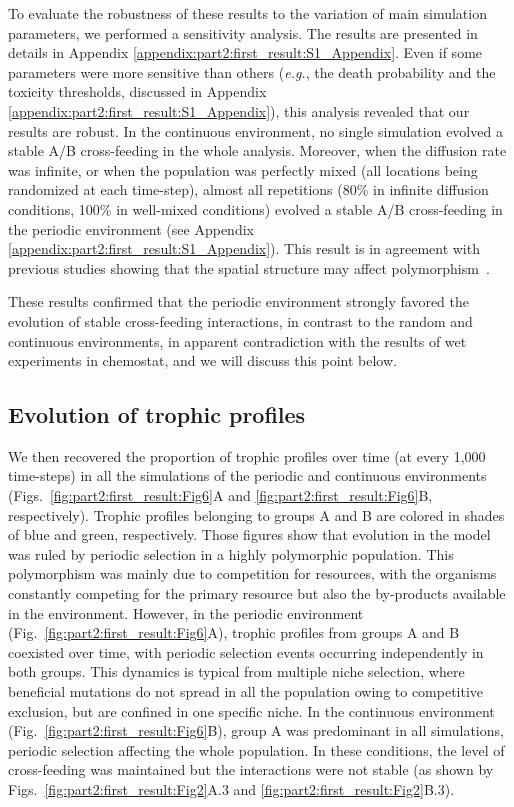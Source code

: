 To evaluate the robustness of these results to the variation of main simulation parameters, we performed a sensitivity analysis. The results are presented in details in Appendix \ref{appendix:part2:first_result:S1_Appendix}. Even if some parameters were more sensitive than others (\textit{e.g.}, the death probability and the toxicity thresholds, discussed in Appendix \ref{appendix:part2:first_result:S1_Appendix}), this analysis revealed that our results are robust.
In the continuous environment, no single simulation evolved a stable A/B cross-feeding in the whole analysis.
Moreover, when the diffusion rate was infinite, or when the population was perfectly mixed (all locations being randomized at each time-step), almost all repetitions (80\% in infinite diffusion conditions, 100\% in well-mixed conditions) evolved a stable A/B cross-feeding in the periodic environment (see Appendix \ref{appendix:part2:first_result:S1_Appendix}).
This result is in agreement with previous studies showing that the spatial structure may affect polymorphism~\citep{hauert-doebeli-2004,gerlee-lundh-2012}.

These results confirmed that the periodic environment strongly favored the evolution of stable cross-feeding interactions, in contrast to the random and continuous environments, in apparent contradiction with the results of wet experiments in chemostat, and we will discuss this point below.


\subsection*{Evolution of trophic profiles}

We then recovered the proportion of trophic profiles over time (at every 1,000 time-steps) in all the simulations of the periodic and continuous environments (Figs.~\ref{fig:part2:first_result:Fig6}A and \ref{fig:part2:first_result:Fig6}B, respectively). Trophic profiles belonging to groups A and B are colored in shades of blue and green, respectively. Those figures show that evolution in the model was ruled by periodic selection in a highly polymorphic population. This polymorphism was mainly due to competition for resources, with the organisms constantly competing for the primary resource but also the by-products available in the environment.
However, in the periodic environment (Fig.~\ref{fig:part2:first_result:Fig6}A), trophic profiles from groups A and B coexisted over time, with periodic selection events occurring independently in both groups. This dynamics is typical from multiple niche selection, where beneficial mutations do not spread in all the population owing to competitive exclusion, but are confined in one specific niche. In the continuous environment (Fig.~\ref{fig:part2:first_result:Fig6}B), group A was predominant in all simulations, periodic selection affecting the whole population. In these conditions, the level of cross-feeding was maintained but the interactions were not stable (as shown by Figs.~\ref{fig:part2:first_result:Fig2}A.3 and \ref{fig:part2:first_result:Fig2}B.3).

